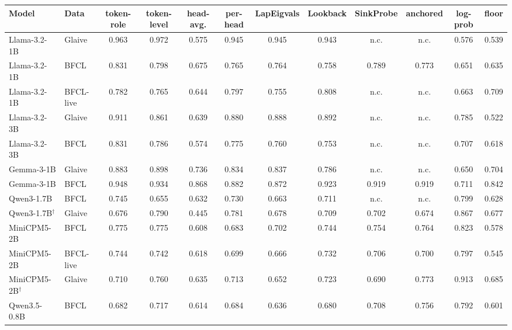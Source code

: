 \begin{tabular}{llcccccccccc}
\toprule
Model & Data & token-role & token-level & head-avg. & per-head & LapEigvals & Lookback & SinkProbe & anchored & log-prob & floor \\
\midrule
Llama-3.2-1B & Glaive & 0.963 & 0.972 & 0.575 & 0.945 & 0.945 & 0.943 & n.c. & n.c. & 0.576 & 0.539 \\
Llama-3.2-1B & BFCL & 0.831 & 0.798 & 0.675 & 0.765 & 0.764 & 0.758 & 0.789 & 0.773 & 0.651 & 0.635 \\
Llama-3.2-1B & BFCL-live & 0.782 & 0.765 & 0.644 & 0.797 & 0.755 & 0.808 & n.c. & n.c. & 0.663 & 0.709 \\
Llama-3.2-3B & Glaive & 0.911 & 0.861 & 0.639 & 0.880 & 0.888 & 0.892 & n.c. & n.c. & 0.785 & 0.522 \\
Llama-3.2-3B & BFCL & 0.831 & 0.786 & 0.574 & 0.775 & 0.760 & 0.753 & n.c. & n.c. & 0.707 & 0.618 \\
Gemma-3-1B & Glaive & 0.883 & 0.898 & 0.736 & 0.834 & 0.837 & 0.786 & n.c. & n.c. & 0.650 & 0.704 \\
Gemma-3-1B & BFCL & 0.948 & 0.934 & 0.868 & 0.882 & 0.872 & 0.923 & 0.919 & 0.919 & 0.711 & 0.842 \\
Qwen3-1.7B & BFCL & 0.745 & 0.655 & 0.632 & 0.730 & 0.663 & 0.711 & n.c. & n.c. & 0.799 & 0.628 \\
Qwen3-1.7B$^\dagger$ & Glaive & 0.676 & 0.790 & 0.445 & 0.781 & 0.678 & 0.709 & 0.702 & 0.674 & 0.867 & 0.677 \\
MiniCPM5-2B & BFCL & 0.775 & 0.775 & 0.608 & 0.683 & 0.702 & 0.744 & 0.754 & 0.764 & 0.823 & 0.578 \\
MiniCPM5-2B & BFCL-live & 0.744 & 0.742 & 0.618 & 0.699 & 0.666 & 0.732 & 0.706 & 0.700 & 0.797 & 0.545 \\
MiniCPM5-2B$^\dagger$ & Glaive & 0.710 & 0.760 & 0.635 & 0.713 & 0.652 & 0.723 & 0.690 & 0.773 & 0.913 & 0.685 \\
Qwen3.5-0.8B & BFCL & 0.682 & 0.717 & 0.614 & 0.684 & 0.636 & 0.680 & 0.708 & 0.756 & 0.792 & 0.601 \\
\bottomrule
\end{tabular}
